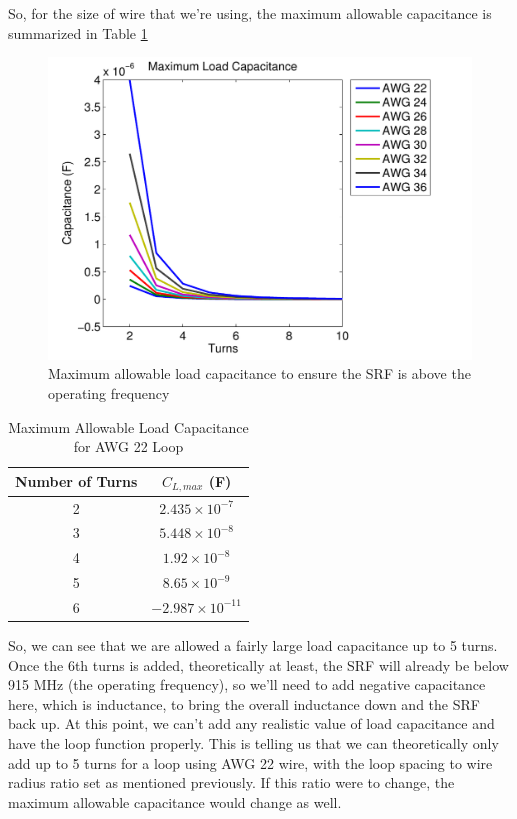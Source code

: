 \documentclass[12pt,onecolumn,titlepage]{article}
\begin{document}
So, for the size of wire that we're using, the maximum allowable capacitance is summarized in Table \ref{tab:Cload_max_AWG22}



\begin{figure}[htbp]
	\centering
	\includegraphics[width=\textwidth]{Pictures/17May2013/Cload_max_v_turns}
	\caption{ Maximum allowable load capacitance to ensure the SRF is above the operating frequency} 
	\label{fig:Cload_max_v_turns}
\end{figure}



\begin{table}[h!]
\centering
	\caption{Maximum Allowable Load Capacitance for AWG 22 Loop}
	\begin{tabular}{| c | c |}
	\hline
	 Number of Turns & $C_{L,max}$ (F) \\ \hline
	 2 & $2.435 \times 10^{-7}$ \\ \hline
	 3 & $5.448 \times 10^{-8}$ \\ \hline
	 4 & $1.92 \times 10^{-8}$ \\ \hline
	 5 & $8.65 \times 10^{-9}$ \\ \hline
	 6 & $-2.987 \times 10^{-11}$ \\ \hline
	\end{tabular}
\label{tab:Cload_max_AWG22}
\end{table}

So, we can see that we are allowed a fairly large load capacitance up to 5 turns. Once the 6th turns is added, theoretically at least, the SRF will already be below 915 MHz (the operating frequency), so we'll need to add negative capacitance here, which is inductance, to bring the overall inductance down and the SRF back up. At this point, we can't add any realistic value of load capacitance and have the loop function properly. This is telling us that we can theoretically only add up to 5 turns for a loop using AWG 22 wire, with the loop spacing to wire radius ratio set as mentioned previously. If this ratio were to change, the maximum allowable capacitance would change as well.
\end{document}

